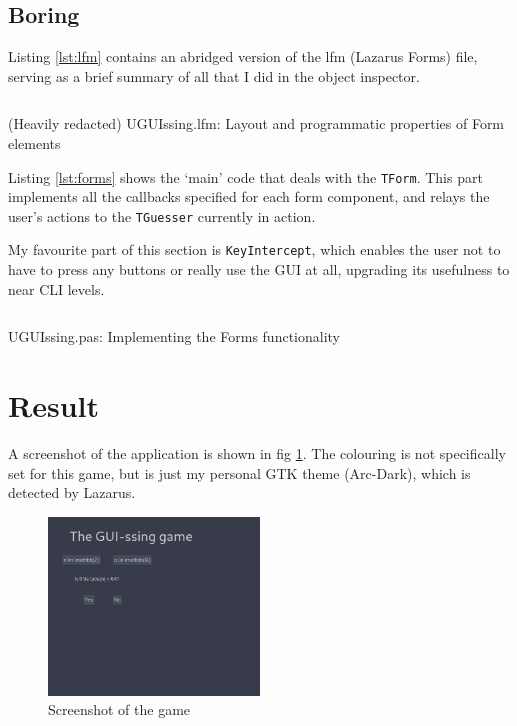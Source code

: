 \documentclass[a4paper,11pt]{article}
\newenvironment{longlisting}
{\addvspace{\baselineskip}\captionsetup{type=listing}}
{\addvspace{\baselineskip}}
\begin{document}
    \subsection{Boring}

    Listing \ref{lst:lfm} contains an abridged version of the lfm (Lazarus
    Forms) file, serving as a brief summary of all that I did in the object
    inspector.

\begin{longlisting}
\inputminted{pascal}{UGUIssing.lfm}
\caption{(Heavily redacted) UGUIssing.lfm: Layout and programmatic properties of
Form elements}
\label{lst:lfm}
\end{longlisting}

    Listing \ref{lst:forms} shows the `main' code that deals with the
    \texttt{TForm}. This part implements all the callbacks specified for each
    form component, and relays the user's actions to the \texttt{TGuesser}
    currently in action.

    My favourite part of this section is \texttt{KeyIntercept}, which enables
    the user not to have to press any buttons or really use the GUI at all,
    upgrading its usefulness to near CLI levels.

\begin{longlisting}
\inputminted{Pascal}{../UGUIssing.pas}
\caption{UGUIssing.pas: Implementing the Forms functionality}
\label{lst:forms}
\end{longlisting}

    \section{Result}

    A screenshot of the application is shown in fig \ref{pic:app}. The colouring
    is not specifically set for this game, but is just my personal GTK theme
    (Arc-Dark), which is detected by Lazarus.

\begin{figure}[H]
\begin{center}
\includegraphics[width=0.5\textwidth]{win_screenshot_20180610_183143.png}
\end{center}
\caption{Screenshot of the game}\label{pic:app}
\end{figure}
\end{document}

